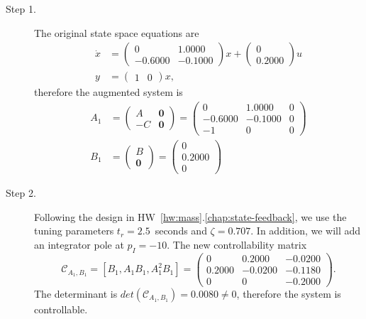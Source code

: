 \begin{description}
\item[Step 1.]
The original state space equations are 
\begin{align*}
\dot{x} &= \begin{pmatrix}          0 &   1.0000 \\
   -0.6000 &  -0.1000 \end{pmatrix}x + \begin{pmatrix}  0 \\
    0.2000 \end{pmatrix} u \\
y &= \begin{pmatrix}1 & 0 \end{pmatrix}x,
\end{align*}
therefore the augmented system is
\begin{align*}
A_1 &= \begin{pmatrix} A & \mathbf{0} \\ -C & \mathbf{0} \end{pmatrix} = \begin{pmatrix}  0 &   1.0000 & 0 \\
   -0.6000 &  -0.1000 & 0  \\ -1 & 0 & 0 \end{pmatrix} \\
B_1 &= \begin{pmatrix} B \\ \mathbf{0} \end{pmatrix} = \begin{pmatrix} 0 \\ 0.2000 \\ 0 \end{pmatrix}
\end{align*}

\item[Step 2.] 
Following the design in HW~\ref{hw:mass}.\ref{chap:state-feedback}, we use the tuning parameters $t_r = 2.5$~seconds and $\zeta = 0.707$.  In addition, we will add an integrator pole at $p_I = -10$.
The new controllability matrix
\[
\mathcal{C}_{A_1,B_1} = [B_1, A_1B_1, A_1^2B_1] = \begin{pmatrix} 
         0 &   0.2000 &  -0.0200 \\
    0.2000 &  -0.0200 &  -0.1180 \\
         0 &        0 &  -0.2000
\end{pmatrix}.
\]
The determinant is $det(\mathcal{C}_{A_1,B_1})=0.0080\neq 0$, therefore the system is controllable.  


\end{description}

